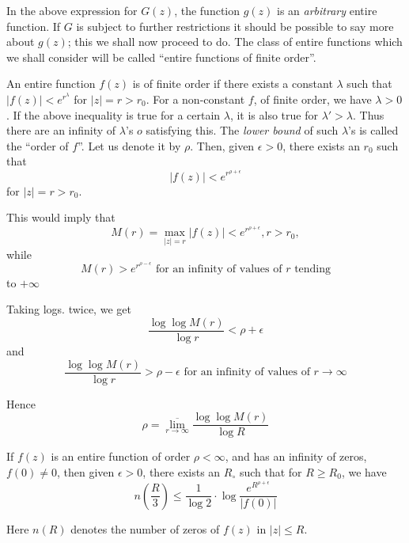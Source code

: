 In the above expression for $G(z)$, the function $g(z)$ is an
\textit{arbitrary} entire function. If $G$ is subject to further
restrictions it should be possible to say more about $g(z)$; this we
shall now proceed to do. The class of entire functions which we shall
consider will be called ``entire functions of finite order''.

\begin{defi*}
An entire function $f(z)$ is of finite order if there exists a
constant $\lambda$ such that $|f(z)| < e^{r^\lambda}$ for $|z| = r >
r_0$. For a non-constant $f$, of finite order, we have $\lambda
>0$. If the above inequality is true for a certain $\lambda$, it is
also true for $\lambda' > \lambda$. Thus there are an infinity of
$\lambda$'s $o$ satisfying this. The {\em lower bound} of such
$\lambda$'s is called the ``order of $f$''. Let us denote it by
$\rho$. Then, given $\epsilon >0$, there exists an $r_0$ such that 
$$
|f(z)| < e^{r^{\rho + \epsilon}}
$$
for $|z| = r> r_0$.
\end{defi*}

This would imply that
$$
M(r) = \max\limits_{|z|=r} |f(z)| < e^{r^{\rho + \epsilon}} , r> r_0,
$$
while\pageoriginale 
$$
M(r) > e^{r^{\rho-\epsilon}} \text{ for an infinity
of values of $r$ tending}
$$
to $+ \infty$

Taking logs. twice, we get
$$
\frac{\log \log M(r)}{\log r} < \rho + \epsilon
$$
and
$$
\frac{\log \log M(r)}{\log r} > \rho - \epsilon \text{ for an
  infinity of values of $r \to \infty$}
$$

Hence
$$
\rho =\overline{\lim\limits_{r\to \infty}} \frac{\log \log M(r)}{\log R}
$$

\begin{thm}\label{chap4:thm2}
If $f(z)$ is an entire function of order $\rho < \infty$, and has an
infinity of zeros, $f(0) \neq 0$, then given $\epsilon >0$, there
exists an $R_\circ$ such that for $R \geq R_0$, we have 
$$
n \left(\frac{R}{3} \right) \leq \frac{1}{\log 2} \cdot \log
\frac{e^{R^{\rho+\epsilon}}}{|f(0)|} 
$$

Here $n(R)$ denotes the number of zeros of $f(z)$ in $|z| \leq R$.
\end{thm}

